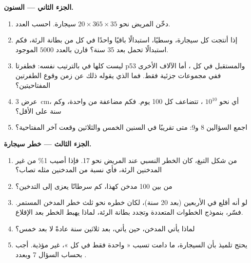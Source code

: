 \begin{problem}
\medskip
\noindent\textbf{الجزء الثاني --- السنون.}
\begin{enumerate}[resume]
  \item دخّن المريض نحو $20 \times 365 \times 35$ سيجارة. احسب
        العدد.
  \item إذا أنتجت كل سيجارة، وسطيًا، استبدالًا باقيًا واحدًا في كل
         من  بطانة الرئة، فكم استبدالًا تحمل  بعد 35
        سنة؟ قارن بالعدد $\num{5000}$ الموجود.
  \item {}  ليست كلها في  بالترتيب نفسه: فطفرتا p53
        والمستقبل في كل  ، أما الآلاف الأخرى ففي مجموعات جزئية
        فقط. فما الذي يقوله ذلك عن زمن وقوع الطفرتين المفتاحيتين؟
  \item عرض  \qty{3}{cm}، أي نحو $10^{10}$ ،  
        تتضاعف كل 100 يوم. فكم مضاعفة من  واحدة، وكم سنة على
        الأقل؟
  \item اجمع السؤالين 8 و9: متى تقريبًا في السنين الخمس والثلاثين
        وقعت آخر  المفتاحية؟
\end{enumerate}

\medskip
\noindent\textbf{الجزء الثالث --- خطر سيجارة.}
\begin{enumerate}[resume]
  \item من شكل التبغ، كان الخطر النسبي عند المريض نحو 17. فإذا أصيب
        1\% من غير المدخنين  الرئة، فأي نسبة من المدخنين مثله
        تصاب؟
  \item من بين 100 مدخن كهذا، كم سرطانًا يعزى إلى التدخين؟
  \item لو أنه أقلع في الأربعين (بعد 20 سنة)، لكان خطره نحو ثلث خطر
        المدخن المستمر. فسّر، بنموذج الخطوات المتعددة وتجدد بطانة
        الرئة، لماذا يهبط الخطر بعد الإقلاع.
  \item لماذا يأتي  المدخن، حين يأتي، بعد ثلاثين سنة عادةً لا بعد
        خمس؟
  \item يحتج تلميذ بأن السيجارة، ما دامت تسبب « واحدة فقط في كل
        »، غير مؤذية. أجب بحساب السؤال 7 وبعدد .
\end{enumerate}


\end{problem}
